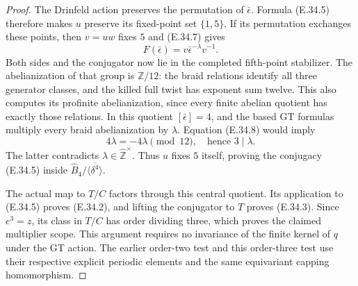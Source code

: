 \begin{proof}
The Drinfeld action preserves the permutation of
$\bar\epsilon$.  Formula \textup{(E.34.5)} therefore
makes $u$ preserve its fixed-point set $\{1,5\}$.
If its permutation exchanges these points, then
$v=uw$ fixes $5$ and \textup{(E.34.7)} gives
\[
                    F(\bar\epsilon)
                       =v\bar\epsilon^{-\lambda}v^{-1}.
 \tag{E.34.8}
\]
Both sides and the conjugator now lie in the
completed fifth-point stabilizer.
The abelianization of that group is $\mathbb Z/12$:
the braid relations identify all three generator
classes, and the killed full twist has exponent
sum twelve.  This also computes its profinite
abelianization, since every finite abelian
quotient has exactly those relations.
In this quotient $[\bar\epsilon]=4$, and the
based GT formulas multiply every braid
abelianization by $\lambda$.
Equation \textup{(E.34.8)} would imply
\[
                     4\lambda=-4\lambda\pmod{12},
                     \quad\text{hence }3\mid\lambda.
 \tag{E.34.9}
\]
The latter contradicts
$\lambda\in\widehat{\mathbb Z}^{\times}$.
Thus $u$ fixes $5$ itself, proving the conjugacy
\textup{(E.34.5)} inside
$\widehat B_4/\overline{\langle\delta^4\rangle}$.

The actual map to $T/C$ factors through this
central quotient.  Its application to
\textup{(E.34.5)} proves \textup{(E.34.2)}, and
lifting the conjugator to $T$ proves
\textup{(E.34.3)}.  Since $e^3=z$, its class in
$T/C$ has order dividing three, which proves
the claimed multiplier scope.  This argument
requires no invariance of the finite kernel
of $q$ under the GT action.  The earlier
order-two test and this order-three test use
their respective explicit periodic elements
and the same equivariant capping homomorphism.
\end{proof}
